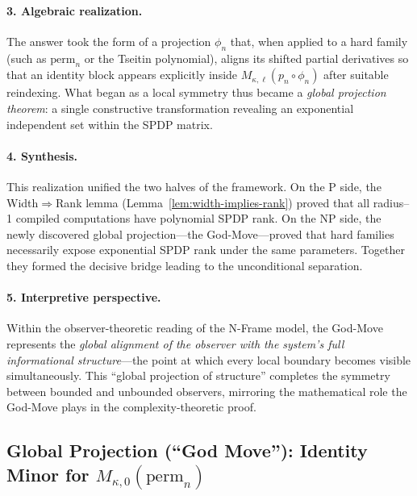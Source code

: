 \documentclass[12pt]{article}
\theoremstyle{definition}
\theoremstyle{definition}
\theoremstyle{remark}
\theoremstyle{remark}
\begin{document}
\paragraph{3. Algebraic realization.}
The answer took the form of a projection $\phi_n$ that, when applied to a hard family
(such as $\mathrm{perm}_n$ or the Tseitin polynomial),
aligns its shifted partial derivatives so that an identity block appears explicitly
inside $M_{\kappa,\ell}(p_n\!\circ\!\phi_n)$ after suitable reindexing.
What began as a local symmetry thus became a \emph{global projection theorem}:
a single constructive transformation revealing an exponential independent set
within the SPDP matrix.

\paragraph{4. Synthesis.}
This realization unified the two halves of the framework.
On the P side, the Width$\Rightarrow$Rank lemma (Lemma~\ref{lem:width-implies-rank})
proved that all radius--1 compiled computations have polynomial SPDP rank.
On the NP side, the newly discovered global projection---the God-Move---proved that
hard families necessarily expose exponential SPDP rank under the same parameters.
Together they formed the decisive bridge leading to the unconditional separation.

\paragraph{5. Interpretive perspective.}
Within the observer-theoretic reading of the N-Frame model,
the God-Move represents the \emph{global alignment of the observer with the system's
full informational structure}---the point at which every local boundary becomes visible
simultaneously.
This ``global projection of structure'' completes the symmetry between bounded
and unbounded observers, mirroring the mathematical role the God-Move plays in
the complexity-theoretic proof.


\subsection{Global Projection (``God Move''): Identity Minor for $M_{\kappa,0}(\mathrm{perm}_n)$}

\end{document}
